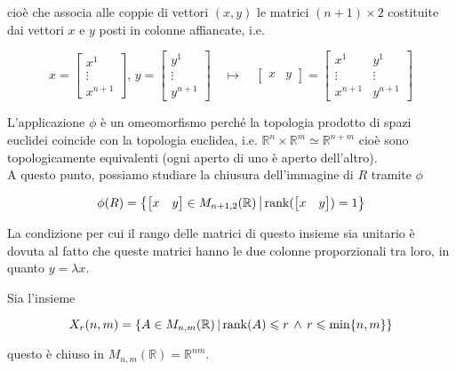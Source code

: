 cioè che associa alle coppie di vettori $ (x,y) $ le matrici $ (n+1) \times 2 $ costituite dai vettori $ x $ e $ y $ posti in colonne affiancate, i.e.

\begin{equation}
	x = \begin{bmatrix} x^{1} \\ \vdots \\ x^{n+1} \end{bmatrix}, \, y = \begin{bmatrix} y^{1} \\ \vdots \\ y^{n+1} \end{bmatrix} \quad \longmapsto \quad \begin{bmatrix} x & y \end{bmatrix} = \begin{bmatrix} x^{1} & y^{1} \\ \vdots & \vdots \\ x^{n+1} & y^{n+1} \end{bmatrix}
\end{equation}

L'applicazione $ \phi $ è un omeomorfismo perché la topologia prodotto di spazi euclidei coincide con la topologia euclidea, i.e. $ \mathbb{R}^{n} \times \mathbb{R}^{m} \simeq \mathbb{R}^{n+m} $ cioè sono topologicamente equivalenti (ogni aperto di uno è aperto dell'altro).\\
A questo punto, possiamo studiare la chiusura dell'immagine di $ R $ tramite $ \phi $

\begin{equation}
	\phi(R) = \left\{ \begin{bmatrix} x & y \end{bmatrix} \in M_{n+1,2}(\mathbb{R}) \, \middle| \, \rank (\begin{bmatrix} x & y \end{bmatrix}) = 1 \right\}
\end{equation}

La condizione per cui il rango delle matrici di questo insieme sia unitario è dovuta al fatto che queste matrici hanno le due colonne proporzionali tra loro, in quanto $ y= \lambda x $.

\begin{lemma}\label{lemma-clos-matrix}
	Sia l'insieme
	
	\begin{equation}
		X_{r}(n,m) = \left\{ A \in M_{n,m}(\mathbb{R}) \, \middle| \, \rank(A) \leqslant r \, \wedge \, r \leqslant \min\{n,m\} \right\}
	\end{equation}

	questo è chiuso in $ M_{n,m}(\mathbb{R}) = \mathbb{R}^{n m} $.
\end{lemma}


